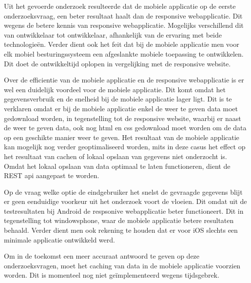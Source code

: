 Uit het gevoerde onderzoek resulteerde dat de mobiele applicatie op de eerste onderzoeksvraag, een beter resultaat haalt dan de responsive
webapplicatie. Dit wegens de betere kennis van responsive webapplicatie. Mogelijks verschillend dit van ontwikkelaar tot ontwikkelaar,
afhankelijk van de ervaring met beide technologieën. Verder dient ook het feit dat bij de mobiele applicatie men voor elk mobiel besturingssysteem
een afgeslankte mobiele toepassing te ontwikkelen. Dit doet de ontwikkeltijd oplopen in vergelijking met de responsive website.

Over de efficientie van de mobiele applicatie en de responsive webapplicatie is er wel een duidelijk voordeel voor de mobiele applicatie.
Dit komt omdat het gegevensverbruik en de snelheid bij de mobiele applicatie lager ligt. Dit is te verklaren omdat er bij de mobiele applicatie
enkel de weer te geven data moet gedownload worden, in tegenstelling tot de responsive website, waarbij er naast de weer te geven data, ook nog html
en css gedownload moet worden om de data op een geschikte manier weer te geven. Het resultaat van de mobiele applicatie kan mogelijk nog verder geoptimaliseerd worden,
mits in deze casus het effect op het resultaat van cachen of lokaal opslaan van gegevens niet onderzocht is. Omdat het lokaal opslaan van data optimaal te laten functioneren,
dient de REST api aangepast te worden.

Op de vraag welke optie de eindgebruiker het snelst de gevraagde gegevens blijt er geen eenduidige voorkeur uit het onderzoek voort de vloeien.
Dit omdat uit de testresultaten bij Android de respsonive webapplicatie beter functioneert. Dit in tegenstelling tot windowsphone, waar de mobiele applicatie betere
resultaten behaald. Verder dient men ook rekening te houden dat er voor iOS slechts een minimale applicatie ontwikkeld werd.

Om in de toekomst een meer accuraat antwoord te geven op deze onderzoeksvragen, moet het caching van data in de mobiele applicatie voorzien worden.
Dit is momenteel nog niet geïmplementeerd wegens tijdsgebrek.

